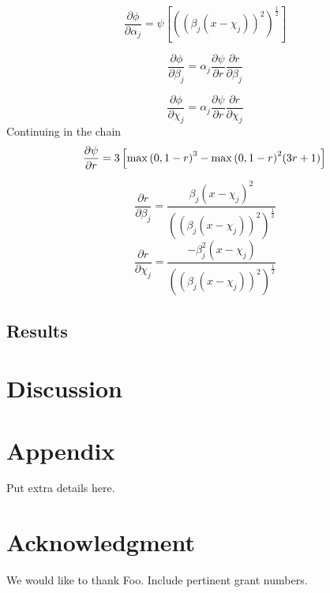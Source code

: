 \documentclass[]{article}
\begin{document}
\begin{equation}
\frac{\partial \phi}{\partial \alpha_j} = \psi \left [ ((\beta_j(x-\chi_j))^2)^{\frac{1}{2}}\right ]
\end{equation}

\begin{equation}
\frac{\partial \phi}{\partial \beta_j} = \alpha_j \frac{\partial
  \psi}{\partial r} \frac{\partial r}{\partial \beta_j}
\end{equation}

\begin{equation}
\frac{\partial \phi}{\partial \chi_j} = \alpha_j \frac{\partial
  \psi}{\partial r} \frac{\partial r}{\partial \chi_j}
\end{equation}
Continuing in the chain
\begin{equation}
\frac{\partial \psi}{\partial r} = 3\left [ \max{(0,1-r)}^3 -
  \max{(0,1-r)}^2(3r+1) \right ]\\
\end{equation}

\begin{equation}
\frac{\partial r}{\partial \beta_j} = 
\frac{\beta_j(x-\chi_j)^2}{((\beta_j(x-\chi_j))^2)^{\frac{1}{2}}}
\end{equation}
\begin{equation}
\frac{\partial r}{\partial \chi_j} = 
\frac{-\beta_j^2(x-\chi_j)}{((\beta_j(x-\chi_j))^2)^{\frac{1}{2}}}
\end{equation}


\subsection{Results}

\section{Discussion}

\section*{Appendix}
Put extra details here.

\section*{Acknowledgment}
We would like to thank Foo. Include pertinent grant numbers.



\end{document}
